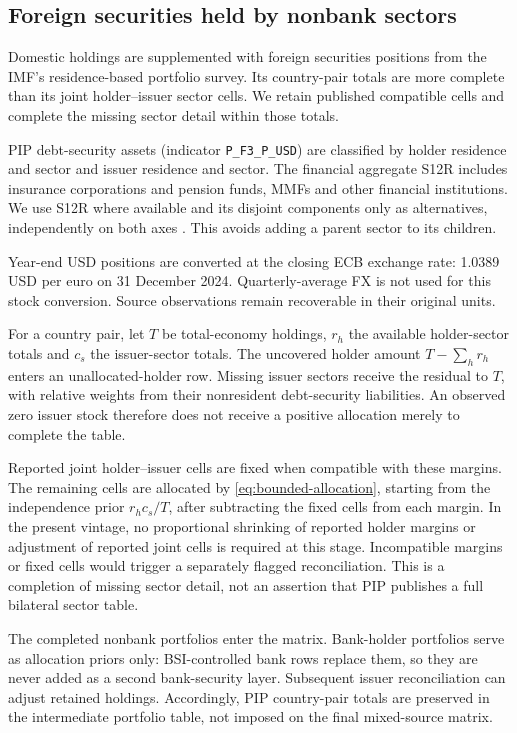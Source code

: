 \subsection{Foreign securities held by nonbank sectors}

Domestic holdings are supplemented with foreign securities positions from the IMF's residence-based portfolio survey. Its country-pair totals are more complete than its joint holder--issuer sector cells. We retain published compatible cells and complete the missing sector detail within those totals.

PIP debt-security assets (indicator \texttt{P\_F3\_P\_USD}) are classified by holder residence and sector and issuer residence and sector. The financial aggregate S12R includes insurance corporations and pension funds, MMFs and other financial institutions. We use S12R where available and its disjoint components only as alternatives, independently on both axes \citep{IMFCPIS2017}. This avoids adding a parent sector to its children.

Year-end USD positions are converted at the closing ECB exchange rate: 1.0389 USD per euro on 31 December 2024. Quarterly-average FX is not used for this stock conversion. Source observations remain recoverable in their original units.

For a country pair, let $T$ be total-economy holdings, $r_h$ the available holder-sector totals and $c_s$ the issuer-sector totals. The uncovered holder amount $T-\sum_h r_h$ enters an unallocated-holder row. Missing issuer sectors receive the residual to $T$, with relative weights from their nonresident debt-security liabilities. An observed zero issuer stock therefore does not receive a positive allocation merely to complete the table.

Reported joint holder--issuer cells are fixed when compatible with these margins. The remaining cells are allocated by \eqref{eq:bounded-allocation}, starting from the independence prior $r_hc_s/T$, after subtracting the fixed cells from each margin. In the present vintage, no proportional shrinking of reported holder margins or adjustment of reported joint cells is required at this stage. Incompatible margins or fixed cells would trigger a separately flagged reconciliation. This is a completion of missing sector detail, not an assertion that PIP publishes a full bilateral sector table.

The completed nonbank portfolios enter the matrix. Bank-holder portfolios serve as allocation priors only: BSI-controlled bank rows replace them, so they are never added as a second bank-security layer. Subsequent issuer reconciliation can adjust retained holdings. Accordingly, PIP country-pair totals are preserved in the intermediate portfolio table, not imposed on the final mixed-source matrix.

